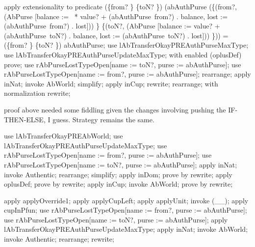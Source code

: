 \begin{LPScript}\begin{zproof}[lAbTransferOkayPRENDResEquiv]
	apply extensionality to predicate (\{from? \} \cup \{toN? \}) \ndres 
		(abAuthPurse \oplus (\{(from?, \theta (AbPurse [balance :=~ * value? + 
		(abAuthPurse~from?) . balance, lost := (abAuthPurse~from?) . lost])) \} \cup 
		\{(toN?, \theta (AbPurse [balance := value? + (abAuthPurse~toN?) . balance, 
		lost := (abAuthPurse~toN?) . lost])) \})) = (\{from? \} \cup \{toN? \}) \ndres abAuthPurse;
    use lAbTransferOkayPREAuthPurseMaxType;
    use lAbTransferOkayPREAuthPurseUpdateMaxType;
    with enabled (oplusDef) prove;
    use rAbPurseLostTypeOpen[name := toN?, purse := abAuthPurse];
    use rAbPurseLostTypeOpen[name := from?, purse := abAuthPurse];
    rearrange;
    apply inNat;
    invoke AbWorld;
    simplify;
    apply inCup;
    rewrite;
    rearrange;
   	with normalization rewrite;
\end{zproof}\end{LPScript}
%
proof above needed some fiddling given the changes involving pushing the IF-THEN-ELSE, I guess. Strategy remains the same.

\begin{LPScript}\begin{zproof}[lAbTransferOkayPREAuthentic]
    use lAbTransferOkayPREAbWorld;
    use lAbTransferOkayPREAuthPurseUpdateMaxType;
    use rAbPurseLostTypeOpen[name := from?, purse := abAuthPurse];
    use rAbPurseLostTypeOpen[name := toN?, purse := abAuthPurse];
    apply inNat;
    invoke Authentic;
    rearrange;
    simplify;
    apply inDom;
    prove by rewrite;
    apply oplusDef;
    prove by rewrite;
    apply inCup;
    invoke AbWorld;
    prove by rewrite;
\end{zproof}\end{LPScript}

\begin{LPScript}\begin{zproof}[lAbTransferOkayPREFromOPlusEquiv]
    apply applyOverride1;
    apply applyCupLeft;
    apply applyUnit;
    invoke (\_\rel \_);
    apply cupInPfun;
    use rAbPurseLostTypeOpen[name := from?, purse := abAuthPurse];
    use rAbPurseLostTypeOpen[name := toN?, purse := abAuthPurse];
    apply lAbTransferOkayPREAuthPurseUpdateMaxType;
    apply inNat;
    invoke AbWorld;
    invoke Authentic;
    rearrange;
    rewrite;
\end{zproof}\end{LPScript}

